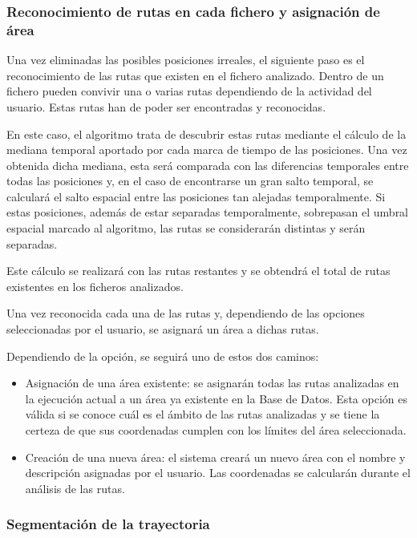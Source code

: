 \subsubsection{Reconocimiento de rutas en cada fichero y asignación de área}
Una vez eliminadas las posibles posiciones irreales, el siguiente paso es el reconocimiento de las rutas que existen en el fichero analizado. Dentro de un fichero pueden convivir una o varias rutas dependiendo de la actividad del usuario. Estas rutas han de poder ser encontradas y reconocidas.

En este caso, el algoritmo trata de descubrir estas rutas mediante el cálculo de la mediana temporal aportado por cada marca de tiempo de las posiciones. Una vez obtenida dicha mediana, esta será comparada con las diferencias temporales entre todas las posiciones y, en el caso de encontrarse un gran salto temporal, se calculará el salto espacial entre las posiciones tan alejadas temporalmente. Si estas posiciones, además de estar separadas temporalmente, sobrepasan el umbral espacial marcado al algoritmo, las rutas se considerarán distintas y serán separadas.

Este cálculo se realizará con las rutas restantes y se obtendrá el total de rutas existentes en los ficheros analizados.

Una vez reconocida cada una de las rutas y, dependiendo de las opciones seleccionadas por el usuario, se asignará un área a dichas rutas.

Dependiendo de la opción, se seguirá uno de estos dos caminos:

\begin{itemize}
	\item Asignación de una área existente: se asignarán todas las rutas analizadas en la ejecución actual a un área ya existente en la Base de Datos. Esta opción es válida si se conoce cuál es el ámbito de las rutas analizadas y se tiene la certeza de que sus coordenadas cumplen con los límites del área seleccionada.
	\item Creación de una nueva área: el sistema creará un nuevo área con el nombre y descripción asignadas por el usuario. Las coordenadas se calcularán durante el análisis de las rutas.
\end{itemize}

\subsubsection{Segmentación de la trayectoria}

